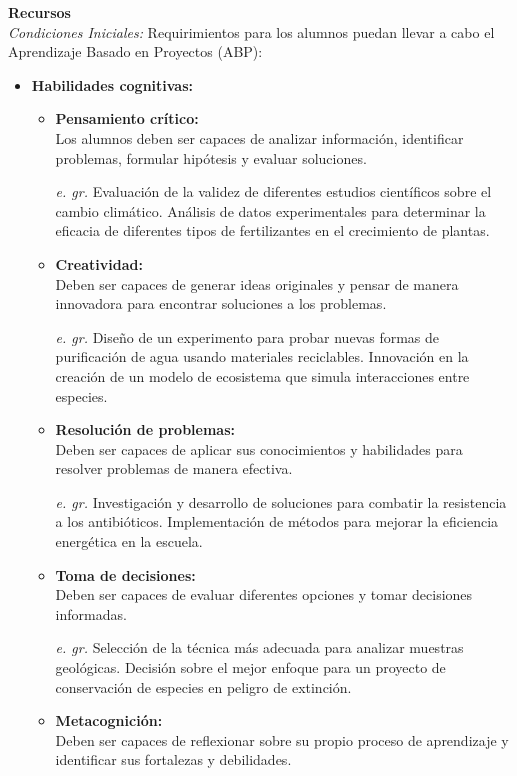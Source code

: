 {\large \textbf{Recursos}}\\
\textit{Condiciones Iniciales:} Requirimientos para los alumnos puedan llevar a cabo el Aprendizaje Basado en Proyectos (ABP):
\begin{itemize}
    \item \textbf{Habilidades cognitivas:}
    \begin{itemize}
        \item \textbf{Pensamiento crítico:}\\
        Los alumnos deben ser capaces de analizar información, identificar problemas, formular hipótesis y evaluar soluciones.
        \item[\textit{e. gr.}]Evaluación de la validez de diferentes estudios científicos sobre el cambio climático. Análisis de datos experimentales para determinar la eficacia de diferentes tipos de fertilizantes en el crecimiento de plantas.
        \item \textbf{Creatividad: }\\
        Deben ser capaces de generar ideas originales y pensar de manera innovadora para encontrar soluciones a los problemas.
        \item[\textit{e. gr.}]Diseño de un experimento para probar nuevas formas de purificación de agua usando materiales reciclables. Innovación en la creación de un modelo de ecosistema que simula interacciones entre especies.
        \item \textbf{Resolución de problemas:}\\
        Deben ser capaces de aplicar sus conocimientos y habilidades para resolver problemas de manera efectiva.
        \item[\textit{e. gr.}]Investigación y desarrollo de soluciones para combatir la resistencia a los antibióticos. Implementación de métodos para mejorar la eficiencia energética en la escuela.
        \item \textbf{Toma de decisiones:} \\
        Deben ser capaces de evaluar diferentes opciones y tomar decisiones informadas.
        \item[\textit{e. gr.}]Selección de la técnica más adecuada para analizar muestras geológicas. Decisión sobre el mejor enfoque para un proyecto de conservación de especies en peligro de extinción.
        \item \textbf{Metacognición:}\\
        Deben ser capaces de reflexionar sobre su propio proceso de aprendizaje y identificar sus fortalezas y debilidades.

\end{itemize}
\end{itemize}
